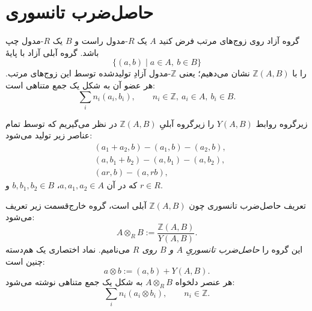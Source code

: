 \section{حاصل‌ضرب تانسوری}

\begin{frame}[t]{گروه آزاد روی زوج‌های مرتب}
    \label{lec19:free-pairs}
    فرض کنید $A$ یک $R$-مدول راست و $B$ یک $R$-مدول چپ باشد.
    گروه آبلی آزاد با پایهٔ
    \[
        \{(a,b)\mid a\in A,\ b\in B\}
    \]
    را با $\mathbb Z(A,B)$ نشان می‌دهیم؛ یعنی $\mathbb Z$-مدول آزادِ تولیدشده
    توسط این زوج‌های مرتب.
    هر عضو آن به شکل یک جمع متناهی است:
    \[
        \sum_i n_i(a_i,b_i),\qquad
        n_i\in\mathbb Z,\ a_i\in A,\ b_i\in B.
    \]
\end{frame}

\begin{frame}[t]{زیرگروه روابط}
    \label{lec19:relations}
    $Y(A,B)$ را زیرگروه آبلیِ $\mathbb Z(A,B)$ در نظر می‌گیریم که توسط
    تمام عناصر زیر تولید می‌شود:
    \[
    \begin{aligned}
        &(a_1+a_2,b)-(a_1,b)-(a_2,b),\\[3pt]
        &(a,b_1+b_2)-(a,b_1)-(a,b_2),\\[3pt]
        &(ar,b)-(a,rb),
    \end{aligned}
    \]
    که در آن $a,a_1,a_2\in A$، $b,b_1,b_2\in B$ و $r\in R$.
\end{frame}

\begin{frame}[t]{تعریف حاصل‌ضرب تانسوری}
    \label{lec19:tensor-definition}
    چون $\mathbb Z(A,B)$ آبلی است، گروه خارج‌قسمت زیر تعریف می‌شود:
    \[
        A\otimes_R B:=\frac{\mathbb Z(A,B)}{Y(A,B)}.
    \]
    این گروه را \textit{حاصل‌ضرب تانسوریِ $A$ و $B$ روی $R$} می‌نامیم.
    نماد اختصاری یک هم‌دسته چنین است:
    \[
        a\otimes b:=(a,b)+Y(A,B).
    \]
    هر عنصر دلخواه $A\otimes_R B$ به شکل یک جمع متناهی نوشته می‌شود:
    \[
        \sum_i n_i(a_i\otimes b_i),\qquad n_i\in\mathbb Z.
    \]
\end{frame}


